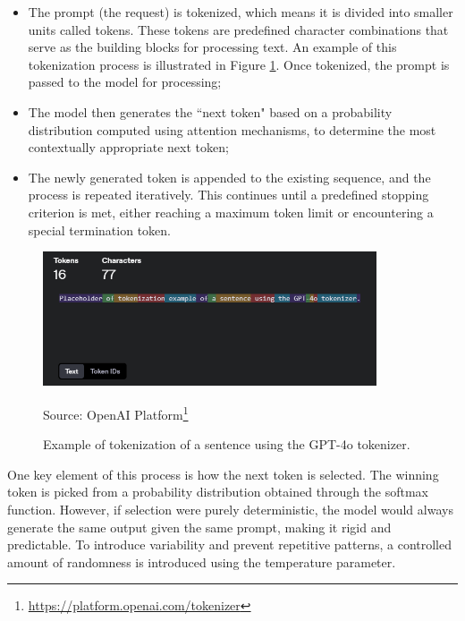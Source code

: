 \begin{itemize}
  \item The prompt (the request) is tokenized, which means it is divided into
    smaller units called tokens. These tokens are predefined character combinations
    that serve as the building blocks for processing text. An example of this
    tokenization process is illustrated in Figure \ref{fig:tokenization_example}.
    Once tokenized, the prompt is passed to the model for processing;

  \item The model then generates the ``next token" based on a probability
    distribution computed using attention mechanisms, to determine the most contextually
    appropriate next token;

  \item The newly generated token is appended to the existing sequence, and the
    process is repeated iteratively. This continues until a predefined stopping criterion
    is met, either reaching a maximum token limit or encountering a special
    termination token.
\end{itemize}

\begin{figure}[h!]
  \centering
  \includegraphics[width=0.88\textwidth]{images/tokenization_example.png}
  \caption{Example of tokenization of a sentence using the GPT-4o tokenizer.}
  { Source: OpenAI Platform\footnote{\url{https://platform.openai.com/tokenizer}}}
  \label{fig:tokenization_example}
\end{figure}

One key element of this process is how the next token is selected. The winning
token is picked from a probability distribution obtained through the softmax
function. However, if selection were purely deterministic, the model would always
generate the same output given the same prompt, making it rigid and predictable.
To introduce variability and prevent repetitive patterns, a controlled amount of
randomness is introduced using the temperature parameter.

